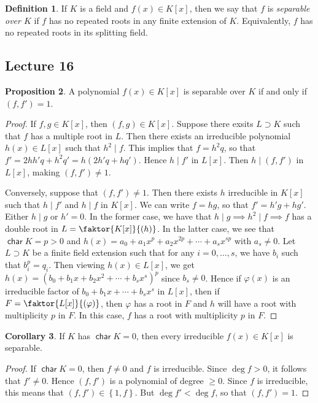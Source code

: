 \documentclass[10pt,letterpaper,cm]{nupset}
\theoremstyle{definition}
\newtheorem{definition}{Definition}[subsection]
\theoremstyle{theorem}
\newtheorem{prop}[definition]{Proposition}
\newtheorem{corollary}[definition]{Corollary}
\theoremstyle{remark}
\newcommand{\1}{\mathbf{1}}
\newcommand{\0}{\vec 0}
\DeclareMathOperator{\Char}{\mathsf{char}}
\begin{document}
\begin{definition}
If $K$ is a field and $f(x) \in K[x]$, then we say that $f$ is \textit{separable over $K$} if $f$ has no repeated roots in any finite extension of $K$. Equivalently, $f$ has no repeated roots in its splitting field.
\end{definition}

\subsection{Lecture 16}

\begin{prop}
A polynomial $f(x) \in K[x]$ is separable over $K$ if and only if $(f, f') =1$.
\end{prop}
\begin{proof}
If $f,g \in K[x]$, then $(f,g) \in K[x]$. Suppose there exsits $L \supset K$ such that $f$ has a multiple root in $L$. Then there exists an irreducible polynomial $h(x) \in L[x]$ such that $h^2 \mid f$. This implies that $f = h^2q$, so that $f' = 2hh'q +h^2q' = h(2h'q+hq')$. Hence $h \mid f'$ in $L[x]$. Then $h \mid (f,f')$ in $L[x]$, making $(f,f') \ne 1$.

\medskip

 
Conversely, suppose that $(f,f') \ne 1$. Then there exists $h$ irreducible in $K[x]$ such that $h\mid f'$ and $h \mid f$ in $K[x]$. We can write $f=hg$, so that $f' = h'g + hg'$. Either $h \mid g$ or $h'=0$. In the former case, we have that $h \mid g \implies h^2 \mid f \implies f$ has a double root in $L = \faktor{K[x]}{(h)}$. In the latter case, we see that $\Char{K} = p>0$ and $h(x) = a_0 + a_1x^p + a_2x^{2p} + \cdots + a_sx^{sp}$ with $a_s \ne 0$. Let $L \supset K$ be a finite field extension such that for any $i=0, \ldots, s$, we have $b_i$ such that $b_i^p = q_i$. Then viewing $h(x) \in L[x]$, we get $h(x) = (b_0 + b_1x + b_2x^2 + \cdots + b_sx^s)^p$ since $b_s \ne 0$. Hence if $\varphi(x)$ is an irreducible factor of $b_0 + b_1x + \cdots + b_sx^s$ in $L[x]$, then if $F = \faktor{L[x]}{(\varphi)}$, then $\varphi$ has a root in $F$ and $h$ will have a root with multiplicity $p$ in $F$. In this case, $f$ has a root with multiplicity $p$ in $F$.
\end{proof}

\begin{corollary}
If $K$ has $\Char{K} =0$, then every irreducible $f(x) \in K[x]$ is separable. 
\end{corollary}
\begin{proof}
If $\Char{K}=0$, then $f \ne 0$ and $f$ is irreducible. Since $\deg{f} >0$, it follows that $f' \ne 0$. Hence $(f,f')$ is a polynomial of degree $\geq 0$. Since $f$ is irreducible, this means that $(f,f') \in \left\{1, f\right\}$. But $\deg{f'} < \deg{f}$, so that $\left(f,f'\right) =1$.
\end{proof}
\end{document}
